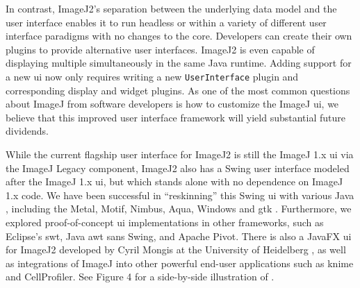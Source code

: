 \documentclass{bmcart}
\begin{document}
In contrast, ImageJ2's separation between the underlying data model and the
user interface enables it to run headless or within a variety of different user
interface paradigms with no changes to the core. Developers can create their
own plugins to provide alternative user interfaces. ImageJ2 is even capable of
displaying multiple  simultaneously in the same Java runtime.
Adding support for a new \acrshort{ui} now only requires writing a new
\texttt{UserInterface} plugin and corresponding display and widget plugins.
As one of the most common questions about ImageJ from software developers is
how to customize the ImageJ \acrshort{ui}, we believe that this improved user
interface framework will yield substantial future dividends.

While the current flagship user interface for ImageJ2 is still the ImageJ 1.x
\acrshort{ui} via the ImageJ Legacy component, ImageJ2 also has a Swing user
interface modeled after the ImageJ 1.x \acrshort{ui}, but which stands alone
with no dependence on ImageJ 1.x code. We have been successful in
``reskinning'' this Swing \acrshort{ui} with various Java ,
including the Metal, Motif, Nimbus, Aqua, Windows and \acrfull{gtk}
. Furthermore, we explored proof-of-concept \acrshort{ui}
implementations in other frameworks, such as Eclipse's \acrshort{swt}, Java
\acrshort{awt} sans Swing, and Apache Pivot. There is also a JavaFX
\acrshort{ui} for ImageJ2 developed by Cyril Mongis at the University of
Heidelberg \cite{imagejfx}, as well as integrations of ImageJ into other
powerful end-user applications such as \acrshort{knime} and CellProfiler. See
Figure 4 for a side-by-side illustration of .
\end{document}
